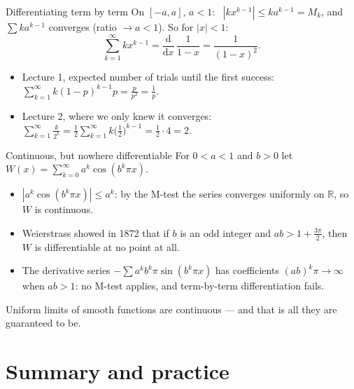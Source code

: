 \documentclass[10pt]{wosm-slides}
\newcommand{\R}{\mathbb{R}}
\begin{document}
\begin{frame}{Differentiating term by term}
  On $[-a, a]$, $a < 1$: \ $|k x^{k-1}| \le k a^{k-1} = M_k$, and $\sum k a^{k-1}$ converges
  (ratio $\to a < 1$). So for $|x| < 1$:
  \[ \sum_{k=1}^\infty k x^{k-1} = \frac{\mathrm{d}}{\mathrm{d}x}\,\frac{1}{1-x} = \frac{1}{(1-x)^2} . \]
  \pause
  \begin{example}
    \begin{itemize}
      \item Lecture 1, expected number of trials until the first success:
        $\sum_{k=1}^\infty k (1-p)^{k-1} p = \frac{p}{p^2} = \frac1p$.
      \item Lecture 2, where we only knew it converges:
        $\sum_{k=1}^\infty \frac{k}{2^k} = \frac12 \sum_{k=1}^\infty k \bigl(\frac12\bigr)^{k-1}
        = \frac12 \cdot 4 = 2$.
    \end{itemize}
  \end{example}
\end{frame}

\begin{frame}{Continuous, but nowhere differentiable}
  For $0 < a < 1$ and $b > 0$ let \
  $W(x) = \sum_{k=0}^\infty a^k \cos(b^k \pi x)$.
  \begin{itemize}
    \item $|a^k \cos(b^k \pi x)| \le a^k$: by the M-test the series converges uniformly on
      $\R$, so $W$ is continuous.
    \item Weierstrass showed in 1872 that if $b$ is an odd integer and
      $ab > 1 + \frac{3\pi}{2}$, then $W$ is differentiable at no point at all.
    \item The derivative series $-\sum a^k b^k \pi \sin(b^k \pi x)$ has coefficients
      $(ab)^k \pi \to \infty$ when $ab > 1$: no M-test applies, and term-by-term
      differentiation fails.
  \end{itemize}
  \pause
  Uniform limits of smooth functions are continuous --- and that is all they are
  guaranteed to be.
\end{frame}

\section{Summary and practice}
\end{document}
